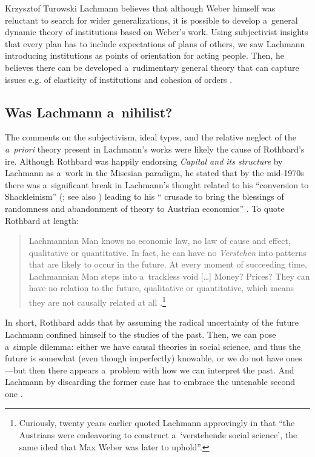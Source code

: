 \begin{artengenv}{Krzysztof Turowski}
Lachmann believes that although Weber himself was reluctant to search for wider generalizations, it is possible to develop a~general dynamic theory of institutions based on Weber's work.
Using subjectivist insights that every plan has to include expectations of plans of others, we saw Lachmann introducing institutions as points of orientation for acting people. Then, he believes there can be developed a~rudimentary general theory that can capture issues e.g. of elasticity of institutions and cohesion of orders \parencite[8]{lachmann-weber}.

\subsection{Was Lachmann a~nihilist?}


The comments on the subjectivism, ideal types, and the relative neglect of the \emph{a~priori} theory present in Lachmann's works were likely the cause of Rothbard's ire.
Although Rothbard was happily endorsing \emph{Capital and its structure} by Lachmann as a~work in the Misesian paradigm, he stated that by the mid-1970s there was a~significant break in Lachmann's thought related to his ``conversion to Shackleinism'' (\cite[53]{rothbard-present}; see also \cite{barbieri2021lachmann}) leading to his `` crusade to bring the blessings of randomness and abandonment of theory to Austrian economics'' \parencite[56--57]{rothbard-hermeneutic}. To quote Rothbard at length:
\begin{quote}
Lachmannian Man knows no economic law, no law of cause and effect, qualitative or quantitative. In fact, he can have no \emph{Verstehen} into patterns that are likely to occur in the future. At every moment of succeeding time, Lachmannian Man steps into a~trackless void [\ldots] Money? Prices? They can have no relation to the future, qualitative or quantitative, which means they are not causally related at all \parencite[52]{rothbard-present}.\footnote{Curiously, twenty years earlier \textcite[50]{rothbard-praxeology-method} quoted Lachmann approvingly in that ``the Austrians were endeavoring to construct a~`verstehende social science', the same ideal that Max Weber was later to uphold''.}
\end{quote}
In short, Rothbard adds that by assuming the radical uncertainty of the future Lachmann confined himself to the studies of the past.
Then, we can pose a~simple dilemma: either we have causal theories in social science, and thus the future is somewhat (even though imperfectly) knowable, or we do not have ones---but then there appears a~problem with how we can interpret the past. And Lachmann by discarding the former case has to embrace the untenable second one \parencite[53--54]{rothbard-present}.


\end{artengenv}
